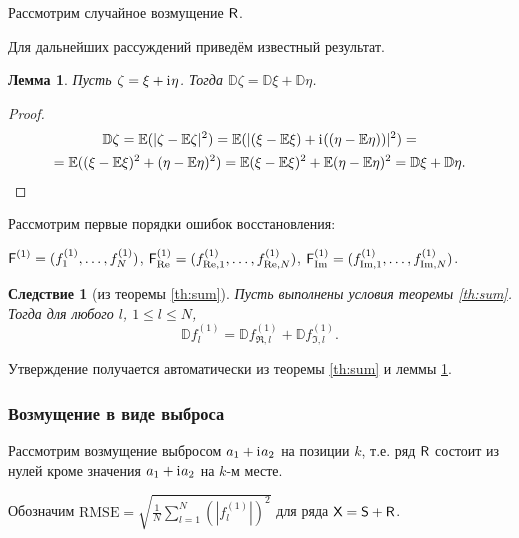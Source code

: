 \documentclass[specialist,
               substylefile = spbu.rtx,
               subf,href,colorlinks=true, 12pt]{disser}
\newtheorem{lemma}{Лемма}
\newtheorem{corollary}{Следствие}
\begin{document}
Рассмотрим случайное возмущение $\textsf{R}$.

Для дальнейших рассуждений приведём известный результат.
\begin{lemma} \label{std:disp}
	Пусть $\zeta = \xi + \mathrm{i}\mkern1mu\eta$. Тогда $\mathbb{D}\zeta = \mathbb{D}\xi + \mathbb{D}\eta$.
\end{lemma}
\begin{proof}
\begin{multline*}
	\mathbb{D}\zeta = \mathbb{E}(|\zeta - \mathbb{E}\zeta|^2) = \mathbb{E}(|(\xi - \mathbb{E}\xi) + \mathrm{i}\mkern1mu((\eta - \mathbb{E}\eta))|^2) = \\
	= \mathbb{E}((\xi - \mathbb{E}\xi)^2 + (\eta - \mathbb{E}\eta)^2)= \mathbb{E}(\xi - \mathbb{E}\xi)^2 + \mathbb{E}(\eta - \mathbb{E}\eta)^2 = \mathbb{D}\xi + \mathbb{D}\eta.
\end{multline*}
\end{proof}

Рассмотрим первые порядки ошибок восстановления:

$\textsf{F}^{(1)} = (f^{(1)}_1, \ldots, f^{(1)}_N)$, $\textsf{F}^{(1)}_{\Re} = (f^{(1)}_{\Re,1}, \ldots, f^{(1)}_{\Re, N})$, $\textsf{F}^{(1)}_{\Im} = (f^{(1)}_{\Im,1}, \ldots, f^{(1)}_{\Im, N})$.


\begin{corollary}[из теоремы {\ref{th:sum}}] \label{st:dispsum}
	Пусть выполнены условия теоремы \ref{th:sum}.
	Тогда для любого $l$, $1\le l \le N$,
	\begin{equation} \label{eq:dispsum}
		\mathbb{D}f^{(1)}_l = \mathbb{D}f^{(1)}_{\Re, l} + \mathbb{D}f^{(1)}_{\Im, l}.	
	\end{equation}
\end{corollary}

Утверждение получается автоматически из теоремы \ref{th:sum} и леммы \ref{std:disp}.

\subsubsection{Возмущение в виде выброса} \label{ss:RMSEinv}

Рассмотрим возмущение выбросом $a_1 + \mathrm{i}\mkern1mu a_2$ на позиции $k$, т.е. ряд $\textsf{R}$ состоит из нулей кроме значения $a_1 + \mathrm{i}\mkern1mu a_2$ на $k$-м месте.

Обозначим $\text{RMSE} = \sqrt{\frac{1}{N}\sum_{l = 1}^{N} (|f^{(1)}_l|)^2}$ для ряда $\textsf{X} = \textsf{S} + \textsf{R}$.
\end{document}
